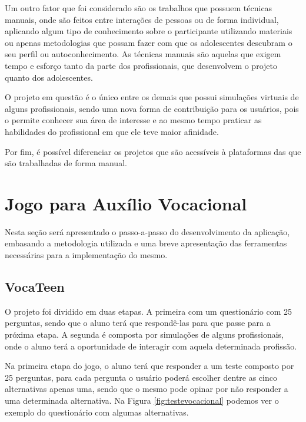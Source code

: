 \documentclass[
	12pt,				%
    oneside,			%
	a4paper,			%
	english,			%
	french,				%
	spanish,			%
	brazil,				%
	]{abntex2}
\begin{document}
Um outro fator que foi considerado são os trabalhos que possuem técnicas manuais, onde são feitos entre interações de pessoas ou de forma individual, aplicando algum tipo de conhecimento sobre o participante utilizando materiais ou apenas metodologias que possam fazer com que os adolescentes descubram o seu perfil ou autoconhecimento. 
As técnicas manuais são aquelas que exigem tempo e esforço tanto da parte dos profissionais, que desenvolvem o projeto quanto dos adolescentes.

O projeto em questão é o único entre os demais que possui simulações virtuais de alguns profissionais, sendo uma nova forma de contribuição para os usuários, pois o permite conhecer sua área de interesse e ao mesmo tempo praticar as habilidades do profissional em que ele teve maior afinidade. 

Por fim, é possível diferenciar os projetos que são acessíveis à plataformas das que são trabalhadas de forma manual. 

\chapter{Jogo para Auxílio Vocacional}

Nesta seção será apresentado o passo-a-passo do desenvolvimento da aplicação, embasando a metodologia utilizada e uma breve apresentação das ferramentas necessárias para a implementação do mesmo.

\section{VocaTeen}

O projeto foi dividido em duas etapas. A primeira com um questionário com 25 perguntas, sendo que o aluno terá que respondê-las para que passe para a próxima etapa. A segunda é composta por simulações de alguns profissionais, onde o aluno terá a oportunidade de interagir com aquela determinada profissão.

Na primeira etapa do jogo, o aluno terá que responder a um teste composto por 25 perguntas, para cada pergunta o usuário poderá escolher dentre as cinco alternativas apenas uma, sendo que o mesmo pode opinar por não responder a uma determinada alternativa. Na Figura \ref{fig:testevocacional} podemos ver o exemplo do questionário com algumas alternativas.
\end{document}
